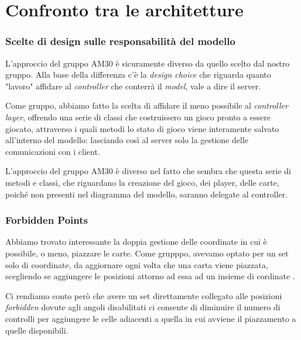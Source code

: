 \documentclass[12pt]{article}
\newcommand*\ttvar[1]{\texttt{\expandafter\dottvar\detokenize{#1}\relax}}
\newcommand*\dottvar[1]{\ifx\relax#1\else
  \expandafter\ifx\string.#1\string.\allowbreak\else#1\fi
  \expandafter\dottvar\fi}
\begin{document}
\newpage
\section{Confronto tra le architetture}


\subsubsection{Scelte di design sulle responsabilità del modello} L'approccio del gruppo AM30 è sicuramente diverso da quello scelto dal nostro gruppo. Alla base della differenza c'è la \textit{design choice} che riguarda quanto "lavoro" affidare al \textit{controller} che conterrà il \textit{model}, vale a dire il server. 

Come gruppo, abbiamo fatto la scelta di affidare il meno possibile al \textit{controller layer}, offrendo una serie di classi che costruissero un gioco pronto a essere giocato, attraverso i quali metodi lo stato di gioco viene interamente salvato all'interno del modello: lasciando così al server solo la gestione delle comunicazioni con i client. 

L'approccio del gruppo AM30 è diverso nel fatto che sembra che questa serie di metodi e classi, che riguardano la creazione del gioco, dei player, delle carte, poiché non presenti nel diagramma del modello, saranno delegate al controller. 

\subsubsection{Forbidden Points} Abbiamo trovato interessante la doppia gestione delle coordinate in cui è possibile, o meno, piazzare le carte. Come grupppo, avevamo optato per un set solo di coordinate, da aggiornare ogni volta che una carta viene piazzata, scegliendo se aggiungere le posizioni attorno ad essa ad un insieme di cordinate \ttvar{Placeable}. 

Ci rendiamo conto però che avere un set direttamente collegato alle posizioni \textit{forbidden} dovute agli angoli disabilitati ci consente di diminuire il numero di controlli per aggiungere le celle adiacenti a quella in cui avviene il piazzamento a quelle disponibili. 
\end{document}
